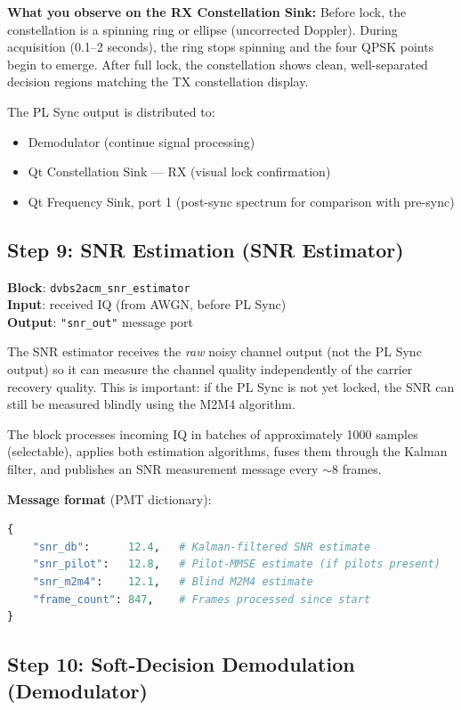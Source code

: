\documentclass[12pt,a4paper]{report}
\begin{document}
\textbf{What you observe on the RX Constellation Sink:} Before lock, the
constellation is a spinning ring or ellipse (uncorrected Doppler). During
acquisition (0.1--2 seconds), the ring stops spinning and the four QPSK points
begin to emerge. After full lock, the constellation shows clean, well-separated
decision regions matching the TX constellation display.

The PL Sync output is distributed to:
\begin{itemize}[nosep]
    \item Demodulator (continue signal processing)
    \item Qt Constellation Sink --- RX (visual lock confirmation)
    \item Qt Frequency Sink, port 1 (post-sync spectrum for comparison with pre-sync)
\end{itemize}

\subsection{Step 9: SNR Estimation (SNR Estimator)}

\textbf{Block}: \texttt{dvbs2acm\_snr\_estimator} \\
\textbf{Input}: received IQ (from AWGN, before PL Sync) \\
\textbf{Output}: \texttt{"snr\_out"} message port

The SNR estimator receives the \emph{raw} noisy channel output (not the
PL Sync output) so it can measure the channel quality independently of the
carrier recovery quality. This is important: if the PL Sync is not yet locked,
the SNR can still be measured blindly using the M2M4 algorithm.

The block processes incoming IQ in batches of approximately 1000 samples
(selectable), applies both estimation algorithms, fuses them through the
Kalman filter, and publishes an SNR measurement message every $\sim$8 frames.

\textbf{Message format} (PMT dictionary):
\begin{lstlisting}[language=python, caption={SNR Estimator output message format}]
{
    "snr_db":      12.4,   # Kalman-filtered SNR estimate
    "snr_pilot":   12.8,   # Pilot-MMSE estimate (if pilots present)
    "snr_m2m4":    12.1,   # Blind M2M4 estimate
    "frame_count": 847,    # Frames processed since start
}
\end{lstlisting}

\subsection{Step 10: Soft-Decision Demodulation (Demodulator)}
\end{document}

